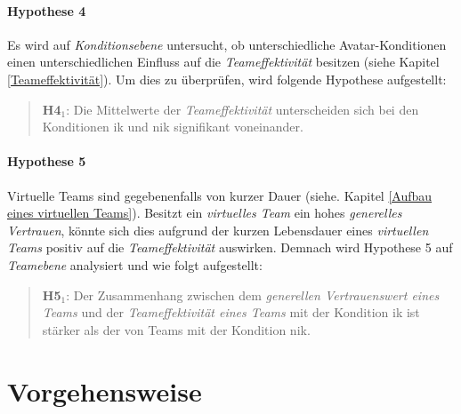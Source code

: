 \documentclass[a4paper,11pt]{article}%
\renewcommand{\\}{\vspace*{0.5\baselineskip} \newline}
\begin{document}
{\paragraph{Hypothese 4}
Es wird auf \textit{Konditionsebene} untersucht, ob unterschiedliche Avatar-Konditionen einen unterschiedlichen Einfluss auf die \textit{Teameffektivität} besitzen (siehe Kapitel \ref{Teameffektivität}).
Um dies zu überprüfen, wird folgende Hypothese aufgestellt:
\begin{quote}
\textbf{H4$_{1}$}: Die Mittelwerte der \textit{Teameffektivität} unterscheiden sich bei den Konditionen \newline \ac{ik} und \ac{nik} signifikant voneinander.
\end{quote}

\newpage
\paragraph{Hypothese 5}
Virtuelle Teams sind gegebenenfalls von kurzer Dauer (siehe. Kapitel \ref{Aufbau eines virtuellen Teams}). Besitzt ein \textit{virtuelles Team} ein hohes \textit{generelles Vertrauen}, könnte sich dies aufgrund der kurzen Lebensdauer eines \textit{virtuellen Teams} positiv auf die \textit{Teameffektivität} auswirken. Demnach wird Hypothese 5 auf \textit{Teamebene} analysiert und wie folgt aufgestellt:
\begin{quote}
\textbf{H5$_{1}$}: Der Zusammenhang zwischen dem \textit{generellen Vertrauenswert eines Teams} und der \textit{Teameffektivität eines Teams} mit der Kondition \ac{ik} ist stärker als der von Teams mit der Kondition \ac{nik}.
\end{quote}
\newpage
\section{Vorgehensweise}

}
\end{document}
